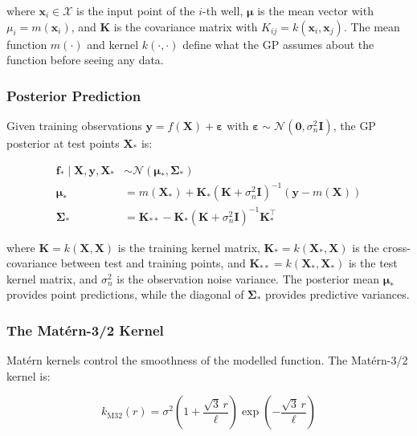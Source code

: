 where $\mathbf{x}_i \in \mathcal{X}$ is the input point of the $i$-th well, $\boldsymbol{\mu}$ is the mean vector with $\mu_i = m(\mathbf{x}_i)$, and $\mathbf{K}$ is
the covariance matrix with $K_{ij} = k(\mathbf{x}_i, \mathbf{x}_j)$. The mean function $m(\cdot)$ and kernel $k(\cdot, \cdot)$ define what the GP assumes about
the function before seeing any data.

\subsubsection{Posterior Prediction}

Given training observations $\mathbf{y} = f(\mathbf{X}) + \boldsymbol{\varepsilon}$ with
$\boldsymbol{\varepsilon} \sim \mathcal{N}(\mathbf{0}, \sigma_n^2 \mathbf{I})$, the GP
posterior at test points $\mathbf{X}_*$ is:

\begin{align}
  \mathbf{f}_* \mid \mathbf{X}, \mathbf{y}, \mathbf{X}_* &\sim \mathcal{N}\!\left(\boldsymbol{\mu}_*, \boldsymbol{\Sigma}_*\right)\\
  \boldsymbol{\mu}_* &= m(\mathbf{X}_*) + \mathbf{K}_{*}\left(\mathbf{K} + \sigma_n^2 \mathbf{I}\right)^{-1}(\mathbf{y} - m(\mathbf{X}))\\
  \boldsymbol{\Sigma}_* &= \mathbf{K}_{**} - \mathbf{K}_{*}\left(\mathbf{K} + \sigma_n^2 \mathbf{I}\right)^{-1}\mathbf{K}_{*}^\top
\end{align}

where $\mathbf{K} = k(\mathbf{X}, \mathbf{X})$ is the training kernel matrix,
$\mathbf{K}_{*} = k(\mathbf{X}_*, \mathbf{X})$ is the cross-covariance between test and
training points, and $\mathbf{K}_{**} = k(\mathbf{X}_*, \mathbf{X}_*)$ is the test kernel
matrix, and $\sigma_n^2$ is the observation noise variance. The posterior mean $\boldsymbol{\mu}_*$ provides point predictions, while the
diagonal of $\boldsymbol{\Sigma}_*$ provides predictive variances.

\subsubsection{The Matérn-3/2 Kernel}

Matérn kernels control the smoothness of the modelled function. The Matérn-3/2 kernel is:

\begin{equation}
  k_{\text{M32}}(r) = \sigma^2 \left(1 + \frac{\sqrt{3}\,r}{\ell}\right) \exp\!\left(-\frac{\sqrt{3}\,r}{\ell}\right)
  \label{eq:matern32}
\end{equation}

